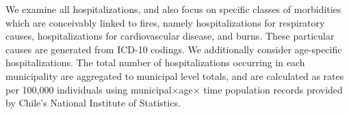 \documentclass[11pt]{article}
\begin{document}
\begin{spacing}{1.3}
We examine all hospitalizations, and also focus on specific classes of morbidities which are conceivably linked to fires, namely hospitalizations for respiratory causes, hospitalizations for cardiovascular disease, and burns.  These particular causes are generated from ICD-10 codings. We additionally consider age-specific hospitalizations.  The total number of hospitalizations occurring in each municipality are aggregated to municipal level totals, and are calculated as rates per 100,000 individuals using municipal$\times$age$\times$ time population records provided by Chile's National Institute of Statistics. 




\end{spacing}
\end{document}
